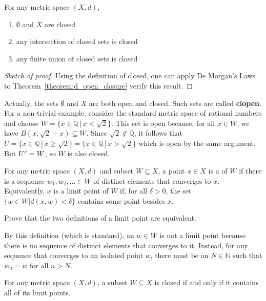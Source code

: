 \begin{corollary}
For any metric space $(X,d)$,
\begin{enumerate}
\item $\emptyset$ and $X$ are closed
\item any intersection of closed sets is closed
\item any finite union of closed sets is closed
\end{enumerate}
\end{corollary}
\begin{proof}[Sketch of proof]
Using the definition of closed, one can apply De Morgan's Laws to Theorem~\ref{theorem:d_open_closure} verify this result.
\end{proof}

Actually, the sets $\emptyset$ and $X$ are both open and closed.
Such sets are called \textbf{clopen}.
For a non-trivial example, consider the standard metric space of rational numbers and choose $W = \{x\in \mathbb{Q}\,|\, x< \sqrt{2}\}$.
This set is open because, for all $x\in W$, we have $B(x,\sqrt{2}-x)\subseteq W$.
Since $\sqrt{2}\notin \mathbb{Q}$, it follows that $U = \{x\in \mathbb{Q}\,|\, x\geq \sqrt{2}\}=\{x\in \mathbb{Q}\,|\, x> \sqrt{2}\}$ which is open by the same argument.
But ${U}^{c} = W$, so $W$ is also closed.

\begin{definition}
For any metric space $(X,d)$ and subset $W \subseteq X$, a point $x\in X$ is a  of $W$ if there is a sequence $w_1,w_2,\ldots\in W$ of distinct elements that converges to $x$.
Equivalently, $x$ is a limit point of $W$ if, for all $\delta >0$, the set $\{ w\in W | d(x,w)<\delta \}$ contains some point besides $x$.
\end{definition}

\begin{problem}
Prove that the two definitions of a limit point are equivalent.
\end{problem}

By this definition (which is standard), an  $w\in W$ is not a limit point because there is no sequence of distinct elements that converges to it.
Instead, for any sequence that converges to an isolated point $w$, there must be an $N\in \mathbb{N}$ such that $w_n = w$ for all $n>N$. 

\begin{theorem}
For any metric space $(X,d)$, a subset $W \subseteq X$ is closed if and only if it contains all of its limit points.
\end{theorem}

